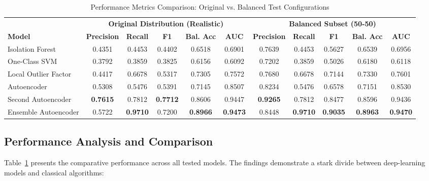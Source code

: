 \begin{table}[t]
  \centering
  \caption{Performance Metrics Comparison: Original vs. Balanced Test Configurations}
  \label{tab:final_results}
  \small
  \begin{tabular}{lccccc|ccccc}
    \toprule
    & \multicolumn{5}{c|}{\textbf{Original Distribution (Realistic)}} & \multicolumn{5}{c}{\textbf{Balanced Subset (50-50)}} \\
    \textbf{Model} & \textbf{Precision} & \textbf{Recall} & \textbf{F1} & \textbf{Bal. Acc} & \textbf{AUC} & \textbf{Precision} & \textbf{Recall} & \textbf{F1} & \textbf{Bal. Acc} & \textbf{AUC} \\
    \midrule
    Isolation Forest & 0.4351 & 0.4453 & 0.4402 & 0.6518 & 0.6901 & 0.7639 & 0.4453 & 0.5627 & 0.6539 & 0.6956 \\
    One-Class SVM    & 0.3792 & 0.3859 & 0.3825 & 0.6156 & 0.6092 & 0.7202 & 0.3859 & 0.5026 & 0.6180 & 0.6118 \\
    Local Outlier Factor & 0.4417 & 0.6678 & 0.5317 & 0.7305 & 0.7572 & 0.7680 & 0.6678 & 0.7144 & 0.7330 & 0.7601 \\
    Autoencoder      & 0.5308 & 0.5476 & 0.5391 & 0.7145 & 0.8507 & 0.8234 & 0.5476 & 0.6578 & 0.7151 & 0.8530 \\
    Second Autoencoder & \textbf{0.7615} & 0.7812 & \textbf{0.7712} & 0.8606 & 0.9447 & \textbf{0.9265} & 0.7812 & 0.8477 & 0.8596 & 0.9436 \\
    Ensemble Autoencoder & 0.5722 & \textbf{0.9710} & 0.7200 & \textbf{0.8966} & \textbf{0.9473} & 0.8448 & \textbf{0.9710} & \textbf{0.9035} & \textbf{0.8963} & \textbf{0.9470} \\
    \bottomrule
  \end{tabular}
\end{table}

\subsection{Performance Analysis and Comparison}
Table~\ref{tab:final_results} presents the comparative performance across all tested models. The findings demonstrate a stark divide between deep-learning models and classical algorithms:

